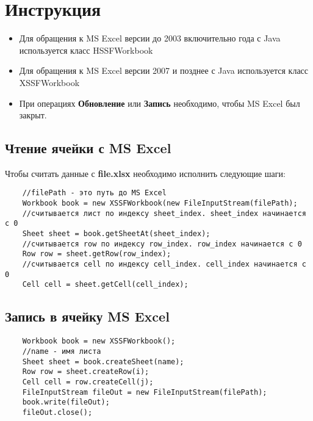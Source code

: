 


\chapter{Инструкция}

\begin{itemize}
	\item Для обращения к MS Excel версии до 2003 включительно года с Java используется класс HSSFWorkbook
	\item Для обращения к MS Excel версии 2007 и позднее с Java используется класс XSSFWorkbook
	\item  При операциях \textbf{Обновление} или \textbf{Запись} необходимо, чтобы MS Excel был закрыт.
\end{itemize}

\section{Чтение ячейки с MS Excel }

Чтобы считать данные с \textbf{file.xlsx} необходимо исполнить следующие шаги:

\begin{lstlisting}
	//filePath - это путь до MS Excel
	Workbook book = new XSSFWorkbook(new FileInputStream(filePath);
	//считывается лист по индексу sheet_index. sheet_index начинается с 0
	Sheet sheet = book.getSheetAt(sheet_index);
	//считывается row по индексу row_index. row_index начинается с 0
	Row row = sheet.getRow(row_index);
	//считывается cell по индексу cell_index. cell_index начинается с 0
	Cell cell = sheet.getCell(cell_index);
\end{lstlisting}

\section{Запись в ячейку MS Excel}

\begin{lstlisting}
	Workbook book = new XSSFWorkbook();
	//name - имя листа
	Sheet sheet = book.createSheet(name);
	Row row = sheet.createRow(i);
	Cell cell = row.createCell(j);
	FileInputStream fileOut = new FileInputStream(filePath);
	book.write(fileOut);
	fileOut.close();
\end{lstlisting}

